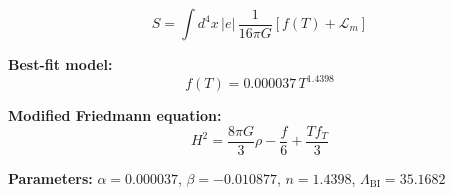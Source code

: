 
\begin{equation}
  S = \int d^4x \, |e| \, \frac{1}{16\pi G} \left[ f(T) + \mathcal{L}_m \right]
\end{equation}

\textbf{Best-fit model:}
\begin{equation}
  f(T) = 0.000037 \, T^{1.4398}
\end{equation}

\textbf{Modified Friedmann equation:}
\begin{equation}
  H^2 = \frac{8\pi G}{3} \rho - \frac{f}{6} + \frac{T f_T}{3}
\end{equation}

\textbf{Parameters:}
$\alpha = 0.000037$, \quad
$\beta = -0.010877$, \quad
$n = 1.4398$, \quad
$\Lambda_{\text{BI}} = 35.1682$